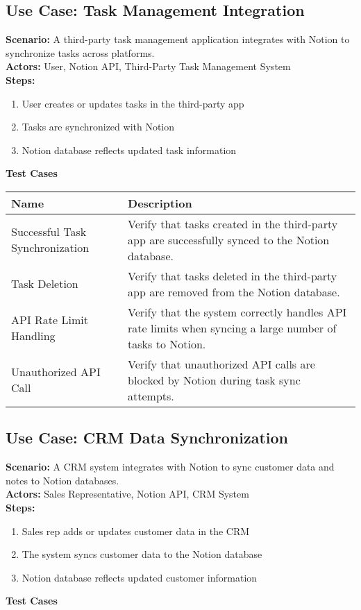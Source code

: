 \documentclass{article}
\begin{document}
\subsection{\textbf{Use Case: Task Management Integration}}
\textbf{Scenario:} A third-party task management application integrates with Notion to synchronize tasks across platforms.\\
\textbf{Actors:} User, Notion API, Third-Party Task Management System\\
\textbf{Steps:}
\begin{enumerate}
\item User creates or updates tasks in the third-party app
\item Tasks are synchronized with Notion
\item Notion database reflects updated task information
\end{enumerate}
\textbf{Test Cases}

            \begin{longtable}{|p{}|p{}|}
            \hline
            \textbf{Name} & \textbf{Description} \\
            \hline
            Successful Task Synchronization & Verify that tasks created in the third-party app are successfully synced to the Notion database. \\
\hline
Task Deletion & Verify that tasks deleted in the third-party app are removed from the Notion database. \\
\hline
API Rate Limit Handling & Verify that the system correctly handles API rate limits when syncing a large number of tasks to Notion. \\
\hline
Unauthorized API Call & Verify that unauthorized API calls are blocked by Notion during task sync attempts. \\
\hline
\end{longtable}\subsection{\textbf{Use Case: CRM Data Synchronization}}
\textbf{Scenario:} A CRM system integrates with Notion to sync customer data and notes to Notion databases.\\
\textbf{Actors:} Sales Representative, Notion API, CRM System\\
\textbf{Steps:}
\begin{enumerate}
\item Sales rep adds or updates customer data in the CRM
\item The system syncs customer data to the Notion database
\item Notion database reflects updated customer information
\end{enumerate}
\textbf{Test Cases}
\end{document}

